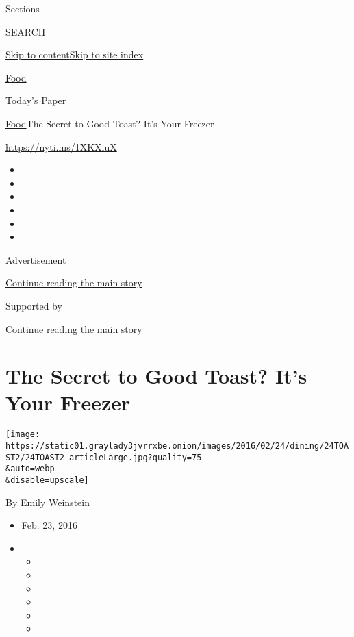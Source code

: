 Sections

SEARCH

\protect\hyperlink{site-content}{Skip to
content}\protect\hyperlink{site-index}{Skip to site index}

\href{https://www.nytimes3xbfgragh.onion/section/food}{Food}

\href{https://myaccount.nytimes3xbfgragh.onion/auth/login?response_type=cookie\&client_id=vi}{}

\href{https://www.nytimes3xbfgragh.onion/section/todayspaper}{Today's
Paper}

\href{/section/food}{Food}\textbar{}The Secret to Good Toast? It's Your
Freezer

\url{https://nyti.ms/1XKXiuX}

\begin{itemize}
\item
\item
\item
\item
\item
\item
\end{itemize}

Advertisement

\protect\hyperlink{after-top}{Continue reading the main story}

Supported by

\protect\hyperlink{after-sponsor}{Continue reading the main story}

\hypertarget{the-secret-to-good-toast-its-your-freezer}{%
\section{The Secret to Good Toast? It's Your
Freezer}\label{the-secret-to-good-toast-its-your-freezer}}

\texttt{[image: https://static01.graylady3jvrrxbe.onion/images/2016/02/24/dining/24TOAST2/24TOAST2-articleLarge.jpg?quality=75\\\&auto=webp\\\&disable=upscale]}

By Emily Weinstein

\begin{itemize}
\item
  Feb. 23, 2016
\item
  \begin{itemize}
  \item
  \item
  \item
  \item
  \item
  \item
  \end{itemize}
\end{itemize}

